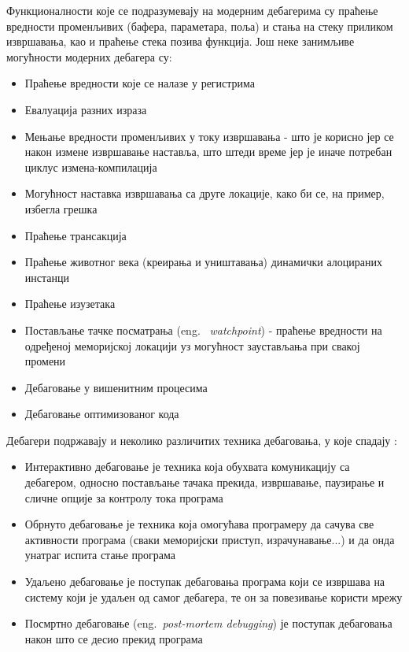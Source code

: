 \documentclass[a4paper]{article}
\begin{document}
Функционалности које се подразумевају на модерним
дебагерима су праћење вредности променљивих (бафера, параметара, поља) и 
стања на стеку приликом извршавања, као и праћење стека позива функција.
Још неке занимљиве могућности модерних дебагера су:
\begin{itemize}
 \item Праћење вредности које се налазе у регистрима
 \item Евалуација разних израза
 \item Мењање вредности променљивих у току извршавања - што је 
       корисно јер се након измене извршавање наставља, што штеди 
       време јер је иначе потребан циклус измена-компилација
 \item Могућност наставка извршавања са друге локације,
       како би се, на пример, избегла грешка
 \item Праћење трансакција
 \item Праћење животног века (креирања и уништавања) 
       динамички алоцираних инстанци
 \item Праћење изузетака
 \item Постављање тачке посматрања (eng. ~{\em watchpoint}) - праћење вредности на одређеној 
       меморијској локацији уз могућност заустављања при свакој промени
 \item Дебаговање у вишенитним процесима
 \item Дебаговање оптимизованог кода
\end{itemize}

Дебагери подржавају и неколико различитих техника дебаговања, у које спадају \cite{debuggingTechniques}:
\begin{itemize}
 \item Интерактивно дебаговање је техника која обухвата комуникацију са дебагером,
       односно постављање тачака прекида, извршавање, паузирање и сличне опције
       за контролу тока програма
 \item Обрнуто дебаговање је техника која омогућава програмеру да сачува све
       активности програма (сваки меморијски приступ, израчунавање...) и да онда
       унатраг испита стање програма
 \item Удаљено дебаговање је поступак дебаговања програма који се извршава на
       систему који је удаљен од самог дебагера, те он за повезивање користи мрежу
 \item Посмртно дебаговање (eng.~{\em post-mortem debugging}) је поступак дебаговања
       након што се десио прекид програма
\end{itemize}
\end{document}
